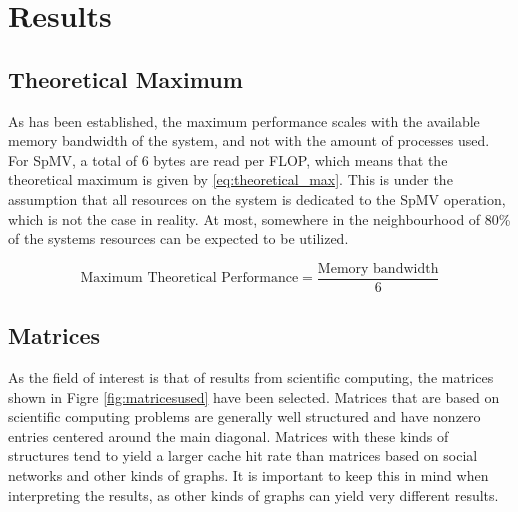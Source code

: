 \chapter{Results} \label{results}

\section{Theoretical Maximum}
As has been established, the maximum performance scales with the available memory bandwidth of the system, and not with the amount of processes used. For SpMV, a total of 6 bytes are read per FLOP, which means that the theoretical maximum is given by \ref{eq:theoretical_max}. This is under the assumption that all resources on the system is dedicated to the SpMV operation, which is not the case in reality. At most, somewhere in the neighbourhood of 80\% of the systems resources can be expected to be utilized.

\begin{equation}
\text{Maximum Theoretical Performance} = \frac{\text{Memory bandwidth}}{6}
\label{eq:theoretical_max}
\end{equation}


\section{Matrices}
As the field of interest is that of results from scientific computing, the matrices shown in Figre \ref{fig:matricesused} have been selected. Matrices that are based on scientific computing problems are generally well structured and have nonzero entries centered around the main diagonal. Matrices with these kinds of structures tend to yield a larger cache hit rate than matrices based on social networks and other kinds of graphs. It is important to keep this in mind when interpreting the results, as other kinds of graphs can yield very different results.

